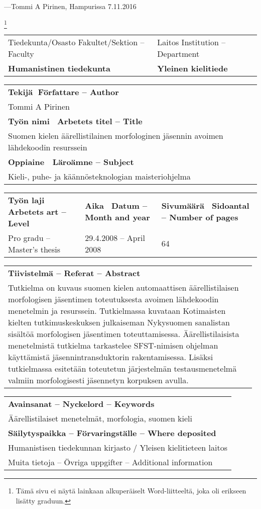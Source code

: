 \documentclass[free]{flammie}
\begin{document}
---Tommi A Pirinen, Hampurissa 7.11.2016


\newpage

\footnote{Tämä sivu ei näytä lainkaan alkuperäiselt Word-liitteeltä, joka oli
erikseen lisätty graduun.}

\begin{tabular}{|l|l|}
\hline
Tiedekunta/Osasto Fakultet/Sektion – Faculty &
Laitos Institution – Department \\
\bf Humanistinen tiedekunta & \bf Yleinen kielitiede \\
\hline
\end{tabular}
\begin{tabular}{|l|}
\hline
\bf Tekijä Författare – Author \\
Tommi A Pirinen \\
\hline
\bf Työn nimi Arbetets titel – Title \\
Suomen kielen äärellistilainen morfologinen jäsennin avoimen lähdekoodin
resurssein \\
\hline
\bf Oppiaine  Läroämne – Subject \\
Kieli-, puhe- ja käännösteknologian maisteriohjelma \\
\hline
\end{tabular}
\begin{tabular}{|l|l|l|}
    \hline
    \bf Työn laji Arbetets art – Level &
    \bf Aika Datum – Month and year &
    \bf Sivumäärä Sidoantal – Number of pages \\
    Pro gradu – Master’s thesis &
    29.4.2008 – April 2008 &
    64 \\
    \hline
\end{tabular}
\begin{tabular}{|p{0.98\linewidth}|}
    \hline
    \bf Tiivistelmä – Referat – Abstract \\
    Tutkielma on kuvaus suomen kielen automaattisen äärellistilaisen morfologisen
    jäsentimen toteutuksesta avoimen lähdekoodin menetelmin ja resurssein.
    Tutkielmassa kuvataan Kotimaisten kielten tutkimuskeskuksen julkaiseman
    Nykysuomen sanalistan sisältöä morfologisen jäsentimen toteuttamisessa.
    Äärellistilaisista menetelmistä tutkielma tarkastelee SFST-nimisen ohjelman
    käyttämistä jäsennintransduktorin rakentamisessa. Lisäksi tutkielmassa
    esitetään toteutetun järjestelmän testausmenetelmä valmiin morfologisesti
    jäsennetyn korpuksen avulla. \\
    \hline
\end{tabular}
\begin{tabular}{|l|}
    \hline
    \bf Avainsanat – Nyckelord – Keywords \\
    Äärellistilaiset menetelmät, morfologia, suomen kieli \\
    \hline
    \bf Säilytyspaikka – Förvaringställe – Where deposited \\
    Humanistisen tiedekunnan kirjasto / Yleisen kielitieteen laitos \\
    \hline
    Muita tietoja – Övriga uppgifter – Additional information \\
    \hline
\end{tabular}
\end{document}
